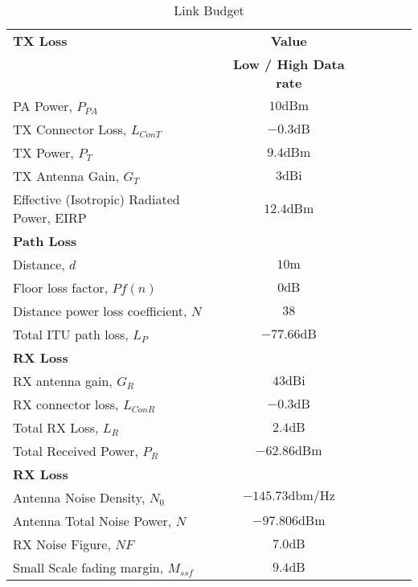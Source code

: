\begin{table}[htbp]
  \centering
  \caption{Link Budget}
    \begin{tabular}{lccccr}
    \rowcolor[rgb]{ 0,  0,  0} \textcolor[rgb]{ 1,  1,  1}{\textbf{TX Loss}}	& \textcolor[rgb]{ 1,  1,  1}{\textbf{Value}} 		\\
    \rowcolor[rgb]{ 0,  0,  0} \textcolor[rgb]{ 1,  1,  1}{} & \textcolor[rgb]{ 1,  1,  1}{\textbf{Low / High Data rate}} 		\\
    PA Power, $P_{PA}$ 						& $10 \text{dBm}$											\\
    TX Connector Loss, $L_{ConT}$  				& $-0.3 \text{dB}$ 											\\
    TX Power, $P_T$ 							& $9.4 \text{dBm}$											\\
    TX Antenna Gain, $G_T$ 					& $3 \text{dBi}$ 											\\
    Effective (Isotropic) Radiated Power, EIRP  		& $12.4 \text{dBm}$										\\
    
    \rowcolor[rgb]{ 0,  0,  0} \textcolor[rgb]{ 1,  1,  1}{\textbf{Path Loss}}
    & \textcolor[rgb]{ 1,  1,  1}{\textbf{}} 															\\
    Distance, $d$  							& $10 \text{m}$ 											\\
    Floor loss factor, $Pf(n)$ 					& $0 \text{dB}$											\\
    Distance power loss coefficient, $N$ 			& $38$ 												\\
    Total ITU path loss, $L_P$ 					& $-77.66 \text{dB}$										\\
    
    \rowcolor[rgb]{ 0,  0,  0} \textcolor[rgb]{ 1,  1,  1}{\textbf{RX Loss}}	& \textcolor[rgb]{ 1,  1,  1}{\textbf{}} 			\\
    RX antenna gain, $G_R$					& $43 \text{dBi}$ 											\\
    RX connector loss, $L_{ConR}$ 				& $-0.3 \text{dB}$ 											\\
    Total RX Loss, $L_R$						& $2.4 \text{dB}$											\\
    Total Received Power, $P_R$ 				& $-62.86 \text{dBm}$										\\
    
    \rowcolor[rgb]{ 0,  0,  0} \textcolor[rgb]{ 1,  1,  1}{\textbf{RX Loss}}	& \textcolor[rgb]{ 1,  1,  1}{\textbf{}} 			\\
    Antenna Noise Density, $N_0$ 				& $-145.73 \text{dbm/Hz}$								\\
    Antenna Total Noise Power, $N$   				& $-97.806 \text{dBm}$										\\
    RX Noise Figure, $NF$ 					& $7.0 \text{dB}$									\\
    Small Scale fading margin, $M_{ssf}$  			& $9.4 \text{dB}$										\\
    

\end{tabular}
\end{table}
